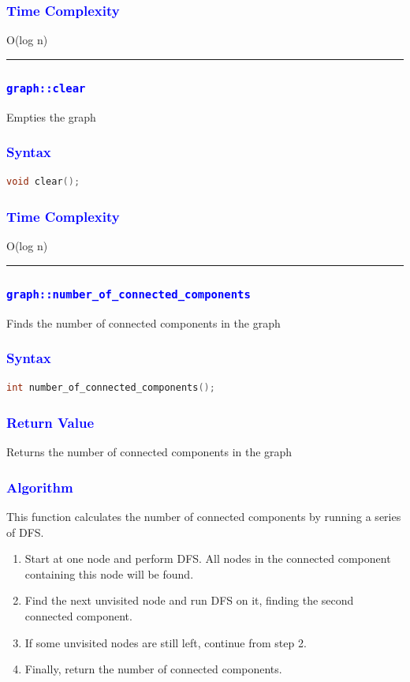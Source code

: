\documentclass[11pt,a4paper]{article}
\begin{document}
\subsubsection*{\textcolor{blue}{ \large {Time Complexity}}}
O(log n)
\\
\rule{17cm}{0.1mm}


\subsubsection*{\textcolor{blue}{ \Large \texttt{graph::clear}}}
Empties the graph

\subsubsection*{\textcolor{blue}{ \large {Syntax}}}
\begin{lstlisting}[language=C++]
void clear();

\end{lstlisting}
\subsubsection*{\textcolor{blue}{ \large {Time Complexity}}}
O(log n)
\\
\rule{17cm}{0.1mm}
\subsubsection*{\textcolor{blue}{\Large\texttt{graph::number\_of\_connected\_components}}}
Finds the number of connected components in the graph


\subsubsection*{\textcolor{blue}{ \large {Syntax}}}
\begin{lstlisting}[language=C++]
int number_of_connected_components();
\end{lstlisting}
\subsubsection*{\textcolor{blue}{ \large {Return Value}}}
Returns the number of connected components in the graph



\subsubsection*{\textcolor{blue}{ \large {Algorithm}}}
This function calculates the number of connected components by running a series of DFS.
\begin{enumerate}  
\item Start at one node and perform DFS. All nodes in the connected component containing this node will be found.
\item Find the next unvisited node and run DFS on it, finding the second connected component.
\item If some unvisited nodes are still left, continue from step 2.
\item Finally, return the number of connected components.

 \end{enumerate}  
\end{document}
